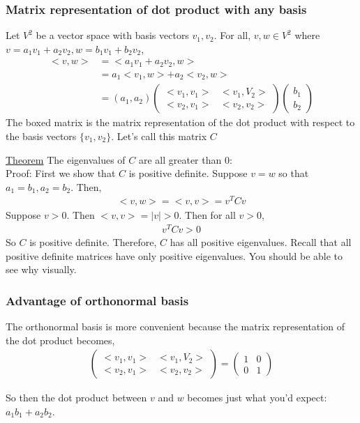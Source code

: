 \documentclass{beamer}
\theoremstyle{definition}
\renewcommand{\=}{&=&}
\newcommand{\<}{\langle}
\renewcommand{\>}{\rangle}
\begin{document}
\begin{frame}[t]
\frametitle{Matrix representation of dot product with any basis}
Let $V^2$ be a vector space with basis vectors $v_1, v_2$.
For all, $v, w \in V^2$ where $v = a_1 v_1 + a_2 v_2, w = b_1 v_1 + b_2 v_2$,
\begin{align*}
  <v, w> &= <a_1 v_1 + a_2 v_2, w> \\
         &= a_1<v_1, w> + a_2<v_2, w> \\
         &= (a_1, a_2) \boxed{\begin{pmatrix}<v_1, v_1> & <v_1, V_2> \\ <v_2, v_1> & <v_2,
v_2>\end{pmatrix}} \begin{pmatrix}b_1 \\ b_2\end{pmatrix}
\end{align*}
The boxed matrix is the matrix representation of the dot product with respect to 
the basis vectors $\{v_1, v_2\}$. Let's call this matrix $C$
\end{frame}
\begin{frame}[t]
\underline{Theorem} The eigenvalues of $C$ are all greater than 0:  \\
Proof: First we show that $C$ is positive definite. Suppose $v = w$ so that $a_1 = b_1,
a_2 = b_2$. Then,
\begin{align*}
  <v, w> = <v, v> = v^TCv
\end{align*}
Suppose $v > 0$. Then $<v, v> = |v| > 0$. Then for all $v > 0$,
\begin{align*}
  v^TCv > 0
\end{align*}
So $C$ is positive definite. Therefore, $C$ has all positive eigenvalues.
Recall that all positive definite matrices have only positive
eigenvalues. You should be able to see why visually. 
\end{frame}
\begin{frame}[t]
\frametitle{Advantage of orthonormal basis}
The orthonormal basis is more convenient because the matrix representation of
the dot product becomes,
\begin{align*}
  \begin{pmatrix}<v_1, v_1> & <v_1, V_2> \\ <v_2, v_1> & <v_2,
v_2>\end{pmatrix} = \begin{pmatrix}1 & 0 \\ 0 & 1\end{pmatrix}
\end{align*}

So then the dot product between $v$ and $w$ becomes just what you'd expect:
$a_1b_1 + a_2b_2$.
\end{frame}
\end{document}
